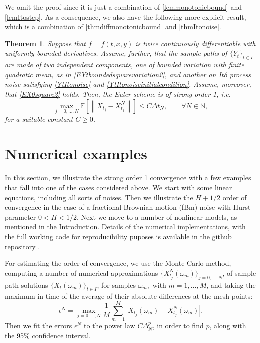 \documentclass[reqno,12pt]{amsart}
\theoremstyle{plain} %
\newtheorem{theorem}{Theorem}[section]
\theoremstyle{definition} %
\begin{document}
We omit the proof since it is just a combination of \cref{lemmonotonicbound} and \cref{lemItostep}. As a consequence, we also have the following more explicit result, which is a combination of \cref{thmdiffmonotonicbound} and \cref{thmItonoise}.

\begin{theorem}
    \label{thmmixedcasepractical}
    Suppose that $f=f(t, x, y)$ is twice continuously differentiable with uniformly bounded derivatives. Assume, further, that the sample paths of $\{Y_t\}_{t\in I}$ are made of two independent components, one of bounded variation with finite quadratic mean, as in \eqref{EYtboundedsquarevariation2}, and another an It\^o process noise satisfying \eqref{YtItonoise} and \eqref{YtItonoiseinitialcondition}. Assume, moreover, that \eqref{EX0square2} holds. Then, the Euler scheme is of strong order 1, i.e.
    \begin{equation}
        \max_{j=0, \ldots, N}\mathbb{E}\left[ \left\| X_{t_j} - X_{t_j}^N \right\| \right] \leq C \Delta t_N, \qquad \forall N \in \mathbb{N},
    \end{equation}
    for a suitable constant $C \geq 0$.
\end{theorem}

\section{Numerical examples}
\label{secnumericalexamples}

In this section, we illustrate the strong order 1 convergence with a few examples that fall into one of the cases considered above. We start with some linear equations, including all sorts of noises. Then we illustrate the $H + 1/2$ order of convergence in the case of a fractional Brownian motion (fBm) noise with Hurst parameter $0 < H < 1/2$. Next we move to a number of nonlinear models, as mentioned in the Introduction. Details of the numerical implementations, with the full working code for reproducibility puposes is available in the github repository \cite{RODEConvEM2023}.

For estimating the order of convergence, we use the Monte Carlo method, computing a number of numerical approximations $\{X_{t_j}^N(\omega_m)\}_{j=0, \ldots, N}$, of sample path solutions $\{X_t(\omega_m)\}_{t\in I}$, for samples $\omega_m,$ with $m = 1, \ldots, M$, and taking the maximum in time of the average of their absolute differences at the mesh points:
\begin{equation}
    \epsilon^N = \max_{j=0, \ldots, N} \frac{1}{M}\sum_{m=1}^M \left|X_{t_j}(\omega_m) - X_{t_j}^N(\omega_m)\right|.
\end{equation}
Then we fit the errors $\epsilon^N$ to the power law $C\Delta_N^p$, in order to find $p$, along with the 95\% confidence interval.
\end{document}
